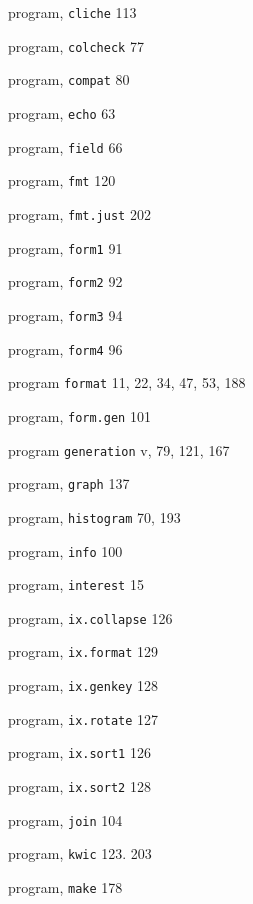 \begin{multicols}{3}
\hangindent=3pc  program, \verb'cliche' 113

\hangindent=3pc  program, \verb'colcheck' 77

\hangindent=3pc  program, \verb'compat' 80

\hangindent=3pc  program, \verb'echo' 63

\hangindent=3pc  program, \verb'field' 66

\hangindent=3pc  program, \verb'fmt' 120

\hangindent=3pc  program, \verb'fmt.just' 202

\hangindent=3pc  program, \verb'form1' 91

\hangindent=3pc  program, \verb'form2' 92

\hangindent=3pc  program, \verb'form3' 94

\hangindent=3pc  program, \verb'form4' 96

\hangindent=3pc  program \verb'format' 11, 22, 34, 47, 53, 188

\hangindent=3pc  program, \verb'form.gen' 101

\hangindent=3pc  program \verb'generation' v, 79, 121, 167

\hangindent=3pc  program, \verb'graph' 137

\hangindent=3pc  program, \verb'histogram' 70, 193

\hangindent=3pc  program, \verb'info' 100

\hangindent=3pc  program, \verb'interest' 15

\hangindent=3pc  program, \verb'ix.collapse' 126

\hangindent=3pc  program, \verb'ix.format' 129

\hangindent=3pc  program, \verb'ix.genkey' 128

\hangindent=3pc  program, \verb'ix.rotate' 127

\hangindent=3pc  program, \verb'ix.sort1' 126

\hangindent=3pc  program, \verb'ix.sort2' 128

\hangindent=3pc  program, \verb'join' 104

\hangindent=3pc  program, \verb'kwic' 123. 203

\hangindent=3pc  program, \verb'make' 178


\end{multicols}
